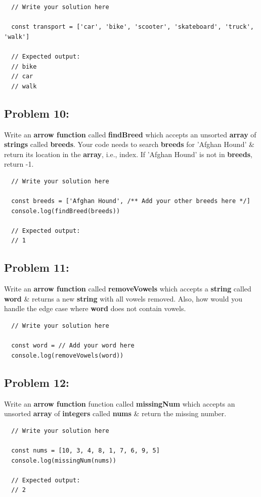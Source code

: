 \documentclass{article}
\begin{document}
\begin{verbatim} 
  // Write your solution here

  const transport = ['car', 'bike', 'scooter', 'skateboard', 'truck', 'walk']

  // Expected output:
  // bike
  // car
  // walk
\end{verbatim}

\subsection*{Problem 10:} 
Write an \textbf{arrow function} called \textbf{findBreed} which accepts an unsorted \textbf{array} of \textbf{strings} called \textbf{breeds}. Your code needs to search \textbf{breeds} for 'Afghan Hound' \& return its location in the \textbf{array}, i.e., index. If 'Afghan Hound' is not in \textbf{breeds}, return -1.

\begin{verbatim}
  // Write your solution here

  const breeds = ['Afghan Hound', /** Add your other breeds here */]
  console.log(findBreed(breeds)) 

  // Expected output:
  // 1
\end{verbatim}

\subsection*{Problem 11:} 
Write an \textbf{arrow function} called \textbf{removeVowels} which accepts a \textbf{string} called \textbf{word} \& returns a new \textbf{string} with all vowels removed. Also, how would you handle the edge case where \textbf{word} does not contain vowels.

\begin{verbatim}
  // Write your solution here

  const word = // Add your word here
  console.log(removeVowels(word))
\end{verbatim}

\subsection*{Problem 12:} 
Write an \textbf{arrow function} function called \textbf{missingNum} which accepts an unsorted \textbf{array} of \textbf{integers} called \textbf{nums} \& return the missing number.

\begin{verbatim}
  // Write your solution here

  const nums = [10, 3, 4, 8, 1, 7, 6, 9, 5]
  console.log(missingNum(nums))

  // Expected output:
  // 2
\end{verbatim}
\end{document}
